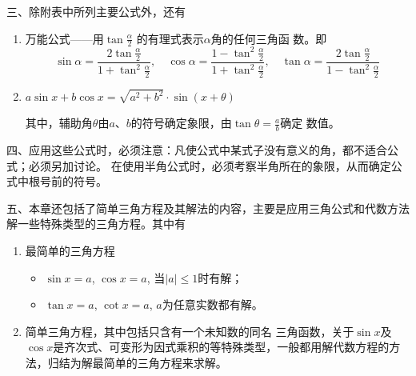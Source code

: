 三、除附表中所列主要公式外，还有
\begin{enumerate}
    \item 万能公式——用$\tan\frac{\alpha}{2}$
的有理式表示$\alpha$角的任何三角函
数。即
\[\sin\alpha=\frac{2\tan\frac{\alpha}{2}}{1+\tan^2\frac{\alpha}{2}},\quad \cos\alpha=\frac{1-\tan^2\frac{\alpha}{2}}{1+\tan^2\frac{\alpha}{2}},\quad \tan\alpha=\frac{2\tan\frac{\alpha}{2}}{1-\tan^2\frac{\alpha}{2}} \]

\item $a\sin x+b\cos x=\sqrt{a^2+b^2}\cdot \sin(x+\theta)$

其中，辅助角$\theta$由$a$、$b$的符号确定象限，由$\tan\theta=\frac{a}{b}$确定
数值。
\end{enumerate}

四、应用这些公式时，必须注意：凡使公式中某式子没有意义的角，都不适合公式；必须另加讨论。
在使用半角公式时，必须考察半角所在的象限，从而确定公式中根号前的符号。

五、本章还包括了简单三角方程及其解法的内容，主要是应用三角公式和代数方法解一些特殊类型的三角方程。其中有
\begin{enumerate}
    \item 最简单的三角方程
    \begin{itemize}
        \item $\sin x=a$, $\cos x=a$, 当$|a|\le 1$时有解；
        \item $\tan x=a$, $\cot x=a$, $a$为任意实数都有解。
    \end{itemize}

\item 简单三角方程，其中包括只含有一个未知数的同名
三角函数，关于$\sin x$及$\cos x$是齐次式、可变形为因式乘积的等特殊类型，一般都用解代数方程的方法，归结为解最简单的三角方程来求解。
\end{enumerate}

